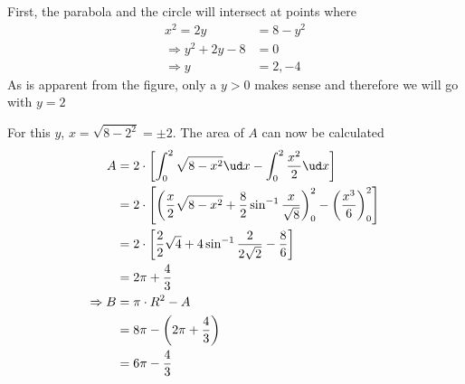 \begin{solution}[\fullpage]
  First, the parabola and the circle will intersect at points where
  \begin{align}
     x^2 = 2y &= 8-y^2 \\
     \Rightarrow y^2+2y-8 &= 0 \\
     \Rightarrow y &= 2, -4
  \end{align}
  As is apparent from the figure, only a $y > 0$ makes sense and therefore
  we will go with $y = 2$
  
  For this $y$, $x = \sqrt{8-2^2} = \pm 2$. The area of $A$ can now be calculated
  \begin{align}
     A &= 2\cdot\left[ \int_0^2 \sqrt{8-x^2}\ud x - \int_0^2\dfrac{x^2}{2}\ud x\right] \\
       &= 2\cdot\left[ \left(\dfrac{x}{2}\sqrt{8-x^2}+\dfrac{8}{2}\sin^{-1}\dfrac{x}{\sqrt{8}}\right)_0^2 
       - \left( \dfrac{x^3}{6}\right)_0^2\right] \\
       &= 2\cdot\left[ \dfrac{2}{2}\sqrt{4}+4\sin^{-1}\dfrac{2}{2\sqrt{2}} - \dfrac{8}{6}\right] \\
       &= 2\pi + \frac{4}{3} \\
    \Rightarrow B &= \pi\cdot R^2 - A \\ 
                  &= 8\pi - \left( 2\pi + \frac{4}{3}\right) \\
                  &= 6\pi - \frac{4}{3}
  \end{align}
  
\end{solution}
